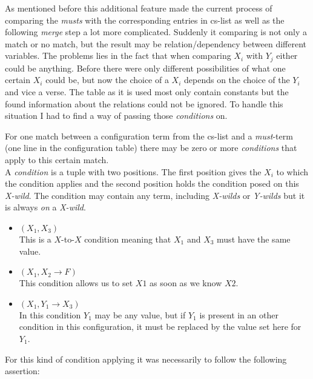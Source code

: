 As mentioned before this additional feature made the current process of comparing the \emph{musts} with the corresponding entries in cs-list as well as the following \emph{merge} step a lot more complicated. Suddenly it comparing is not only a match or no match, but the result may be relation/dependency between different variables. The problems lies in the fact that when comparing $X_i$ with $Y_j$ either could be anything. Before there were only different possibilities of what one certain $X_i$ could be, but now the choice of a $X_i$ depends on the choice of the $Y_i$ and vice a verse. The table as it is used most only contain constants but the found information about the relations could not be ignored. To handle this situation I had to find a way of passing those \emph{conditions} on. 

\begin{definition}
For one match between a configuration term from the cs-list and a \emph{must}-term (one line in the configuration table) there may be zero or more \emph{conditions} that apply to this certain match. \\
A \emph{condition} is a tuple with two positions. The first position gives the $X_i$ to which the condition applies and the second position holds the condition posed on this \emph{X-wild}. The condition may contain any term, including \emph{X-wilds} or \emph{Y-wilds} but it is always \emph{on} a \emph{X-wild}.
\end{definition}

\begin{example}
	\begin{itemize}Conditions on $X_i$
		\item $(X_1, X_3)$\\ This is a $X$-to-$X$ condition meaning that $X_1$ and $X_3$ must have the same value.
		\item $(X_1, X_2 \rightarrow F)$\\ This condition allows us to set $X1$ as soon as we know $X2$.
		\item $(X_1, Y_1 \rightarrow X_3)$\\ In this condition $Y_1$ may be any value, but if $Y_1$ is present in an other condition in this configuration, it must be replaced by the value set here for $Y_1$.
	\end{itemize}
\end{example}

For this kind of condition applying it was necessarily to follow the following assertion:


